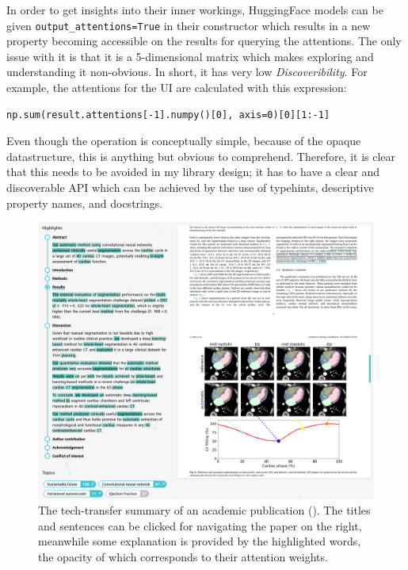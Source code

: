 \begin{displayquote}
In order to get insights into their inner workings, HuggingFace models can be given \texttt{output\_attentions=True} in their constructor which results in a new property becoming accessible on the results for querying the attentions. The only issue with it is that it is a 5-dimensional matrix which makes exploring and understanding it non-obvious. In short, it has very low \textit{Discoveribility}. For example, the attentions for the UI are calculated with this expression:
\begin{verbatim}
np.sum(result.attentions[-1].numpy()[0], axis=0)[0][1:-1]
\end{verbatim}
Even though the operation is conceptually simple, because of the opaque datastructure, this is anything but obvious to comprehend. Therefore, it is clear that this needs to be avoided in my library design; it has to have a clear and discoverable API which can be achieved by the use of typehints, descriptive property names, and docstrings.
\end{displayquote}

\begin{figure}
    \centering
    \includegraphics[width=1\linewidth]{figures/dashboard-highlights.png}
    \captionsetup{width=.9\linewidth}
    \caption{The tech-transfer summary of an academic publication (\cite{bruns2022deep}). The titles and sentences can be clicked for navigating the paper on the right, meanwhile some explanation is provided by the highlighted words, the opacity of which corresponds to their attention weights.}
    \label{fig:dashboard-highlights}
\end{figure}

